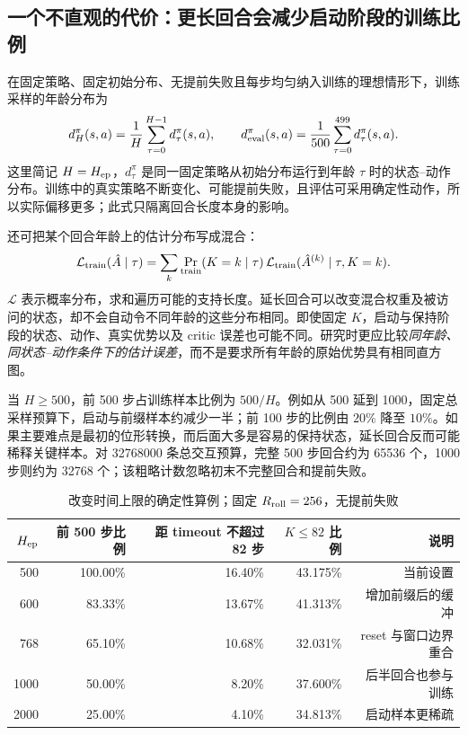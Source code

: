 \documentclass[12pt,fontset=none]{ctexart}
\numberwithin{equation}{section}
\numberwithin{table}{section}
\numberwithin{figure}{section}
\begin{document}
\subsection{一个不直观的代价：更长回合会减少启动阶段的训练比例}

在固定策略、固定初始分布、无提前失败且每步均匀纳入训练的理想情形下，训练采样的年龄分布为
\begin{equation}\label{eq:gaet-occupancy}
 d_H^\pi(s,a)=\frac1H\sum_{\tau=0}^{H-1}d_\tau^\pi(s,a),
 \qquad
 d_{\rm eval}^\pi(s,a)=\frac1{500}\sum_{\tau=0}^{499}d_\tau^\pi(s,a).
\end{equation}
这里简记 $H=H_{\rm ep}$，$d_\tau^\pi$ 是同一固定策略从初始分布运行到年龄 $\tau$ 时的状态--动作分布。训练中的真实策略不断变化、可能提前失败，且评估可采用确定性动作，所以实际偏移更多；此式只隔离回合长度本身的影响。

还可把某个回合年龄上的估计分布写成混合：
\begin{equation}\label{eq:gaet-mixture}
 \mathcal L_{\rm train}(\hat A\mid\tau)
 =\sum_k\Pr_{\rm train}(K=k\mid\tau)\,
 \mathcal L_{\rm train}(\hat A^{(k)}\mid\tau,K=k).
\end{equation}
$\mathcal L$ 表示概率分布，求和遍历可能的支持长度。延长回合可以改变混合权重及被访问的状态，却不会自动令不同年龄的这些分布相同。即使固定 $K$，启动与保持阶段的状态、动作、真实优势以及 critic 误差也可能不同。研究时更应比较\emph{同年龄、同状态--动作条件下的估计误差}，而不是要求所有年龄的原始优势具有相同直方图。

当 $H\geq500$，前 500 步占训练样本比例为 $500/H$。例如从 500 延到 1000，固定总采样预算下，启动与前缀样本约减少一半；前 100 步的比例由 $20\%$ 降至 $10\%$。如果主要难点是最初的位形转换，而后面大多是容易的保持状态，延长回合反而可能稀释关键样本。对 32768000 条总交互预算，完整 500 步回合约为 65536 个，1000 步则约为 32768 个；该粗略计数忽略初末不完整回合和提前失败。

\begin{table}[!ht]
\centering\small
\caption{改变时间上限的确定性算例；固定 $R_{\rm roll}=256$，无提前失败}\label{tab:gaet-horizons}
\begin{tabular}{rrrrr}
\toprule
$H_{\rm ep}$ & 前 500 步比例 & 距 timeout 不超过 82 步 & $K\leq82$ 比例 & 说明 \\
\midrule
500 & 100.00\% & 16.40\% & 43.175\% & 当前设置 \\
600 & 83.33\% & 13.67\% & 41.313\% & 增加前缀后的缓冲 \\
768 & 65.10\% & 10.68\% & 32.031\% & reset 与窗口边界重合 \\
1000 & 50.00\% & 8.20\% & 37.600\% & 后半回合也参与训练 \\
2000 & 25.00\% & 4.10\% & 34.813\% & 启动样本更稀疏 \\
\bottomrule
\end{tabular}
\end{table}
\end{document}
